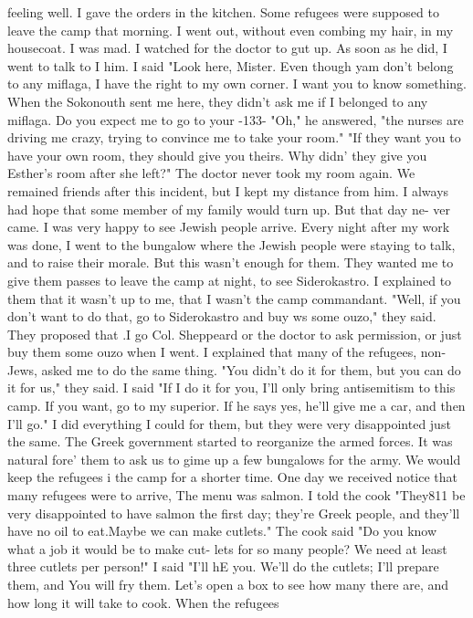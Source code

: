 feeling well. I gave the orders in the kitchen. Some refugees were supposed to leave 
the camp that morning. I went out, without even combing my hair, in my housecoat. I 
was mad. I watched for the doctor to gut up. As soon as he did, I went to talk to 
I 
him. I said "Look here, Mister. Even though yam don't belong to any miflaga, I have 
the right to my own corner. I want you to know something. When the Sokonouth sent me 
here, they didn't ask me if I belonged to any miflaga. Do you expect me to go to your 
-133- 
"Oh," he answered, "the nurses are driving me crazy, trying to convince me to 
take your room." 
"If they want you to have your own room, they should give you theirs. Why didn' 
they give you Esther's room after she left?" The doctor never took my room again. We 
remained friends after this incident, but I kept my distance from him. 
I always had hope that some member of my family would turn up. But that day ne-
ver came. I was very happy to see Jewish people arrive. Every night after my work 
was done, I went to the bungalow where the Jewish people were staying to talk, and to 
raise their morale. But this wasn't enough for them. They wanted me to give them 
passes to leave the camp at night, to see Siderokastro. I explained to them that it 
wasn't up to me, that I wasn't the camp commandant. "Well, if you don't want to do 
that, go to Siderokastro and buy ws some ouzo," they said. They proposed that .I go 
Col. Sheppeard or the doctor to ask permission, or just buy them some ouzo when I 
went. I explained that many of the refugees, non-Jews, asked me to do the same thing. 
"You didn't do it for them, but you can do it for us," they said. I said "If I do it 
for you, I'll only bring antisemitism to this camp. If you want, go to my superior. 
If he says yes, he'll give me a car, and then I'll go." I did everything I could for 
them, but they were very disappointed just the same. 
The Greek government started to reorganize the armed forces. It was natural fore' 
them to ask us to gime up a few bungalows for the army. We would keep the refugees i 
the camp for a shorter time. One day we received notice that many refugees were to 
arrive, The menu was salmon. I told the cook "They811 be very disappointed to have 
salmon the first day; they're Greek people, and they'll have no oil to eat.Maybe we 
can make cutlets." The cook said "Do you know what a job it would be to make cut-
lets for so many people? We need at least three cutlets per person!" I said "I'll hE 
you. We'll do the cutlets; I'll prepare them, and You will fry them. Let's open a 
box to see how many there are, and how long it will take to cook. When the refugees 
